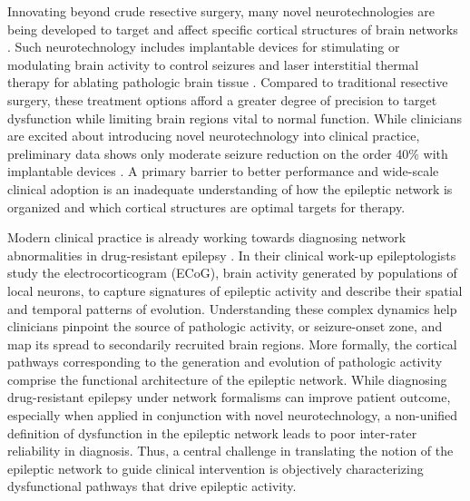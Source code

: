 Innovating beyond crude resective surgery, many novel neurotechnologies are being developed to target and affect specific cortical structures of brain networks \cite{stacey2008technology}. Such neurotechnology includes implantable devices for stimulating or modulating brain activity to control seizures \cite{fisher2010electrical, morrell2011responsive} and laser interstitial thermal therapy for ablating pathologic brain tissue \cite{tovar-spinoza2013use, medvid2015current}. Compared to traditional resective surgery, these treatment options afford a greater degree of precision to target dysfunction while limiting brain regions vital to normal function. While clinicians are excited about introducing novel neurotechnology into clinical practice, preliminary data shows only moderate seizure reduction on the order 40\% with implantable devices \cite{morrell2011responsive}. A primary barrier to better performance and wide-scale clinical adoption is an inadequate understanding of how the epileptic network is organized and which cortical structures are optimal targets for therapy.

Modern clinical practice is already working towards diagnosing network abnormalities in drug-resistant epilepsy \cite{spencer2002neural}. In their clinical work-up epileptologists study the electrocorticogram (ECoG), brain activity generated by populations of local neurons, to capture signatures of epileptic activity and describe their spatial and temporal patterns of evolution. Understanding these complex dynamics help clinicians pinpoint the source of pathologic activity, or seizure-onset zone, and map its spread to secondarily recruited brain regions. More formally, the cortical pathways corresponding to the generation and evolution of pathologic activity comprise the functional architecture of the epileptic network. While diagnosing drug-resistant epilepsy under network formalisms can improve patient outcome, especially when applied in conjunction with novel neurotechnology, a non-unified definition of dysfunction in the epileptic network leads to poor inter-rater reliability in diagnosis. Thus, a central challenge in translating the notion of the epileptic network to guide clinical intervention is objectively characterizing dysfunctional pathways that drive epileptic activity.

